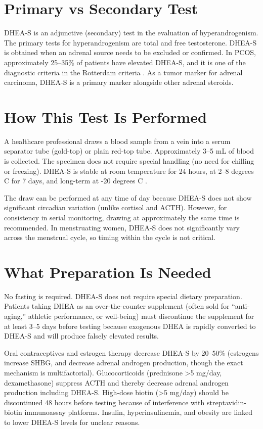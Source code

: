 \section*{Primary vs Secondary Test}
DHEA-S is an adjunctive (secondary) test in the evaluation of hyperandrogenism. The primary tests for hyperandrogenism are total and free testosterone. DHEA-S is obtained when an adrenal source needs to be excluded or confirmed. In PCOS, approximately 25--35\% of patients have elevated DHEA-S, and it is one of the diagnostic criteria in the Rotterdam criteria \cite{teede2018recommendations}. As a tumor marker for adrenal carcinoma, DHEA-S is a primary marker alongside other adrenal steroids.

\section*{How This Test Is Performed}
A healthcare professional draws a blood sample from a vein into a serum separator tube (gold-top) or plain red-top tube. Approximately 3--5 mL of blood is collected. The specimen does not require special handling (no need for chilling or freezing). DHEA-S is stable at room temperature for 24 hours, at 2--8 degrees C for 7 days, and long-term at -20 degrees C \cite{rifai2018tietz}.

The draw can be performed at any time of day because DHEA-S does not show significant circadian variation (unlike cortisol and ACTH). However, for consistency in serial monitoring, drawing at approximately the same time is recommended. In menstruating women, DHEA-S does not significantly vary across the menstrual cycle, so timing within the cycle is not critical.

\section*{What Preparation Is Needed}
No fasting is required. DHEA-S does not require special dietary preparation. Patients taking DHEA as an over-the-counter supplement (often sold for ``anti-aging,'' athletic performance, or well-being) must discontinue the supplement for at least 3--5 days before testing because exogenous DHEA is rapidly converted to DHEA-S and will produce falsely elevated results.

Oral contraceptives and estrogen therapy decrease DHEA-S by 20--50\% (estrogens increase SHBG, and decrease adrenal androgen production, though the exact mechanism is multifactorial). Glucocorticoids (prednisone >5 mg/day, dexamethasone) suppress ACTH and thereby decrease adrenal androgen production including DHEA-S. High-dose biotin (>5 mg/day) should be discontinued 48 hours before testing because of interference with streptavidin-biotin immunoassay platforms. Insulin, hyperinsulinemia, and obesity are linked to lower DHEA-S levels for unclear reasons.

